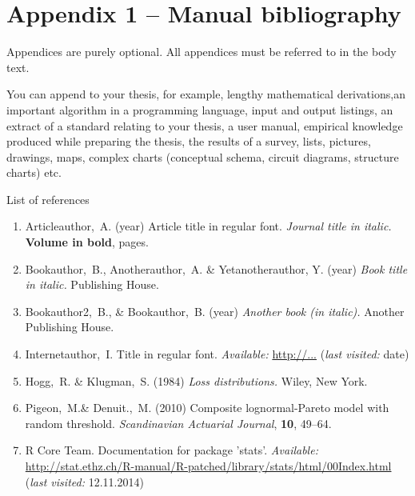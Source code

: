 \section*{Appendix 1 -- Manual bibliography}

Appendices are purely optional. All appendices must be referred to in the body text.

You can append to your thesis, for example, lengthy mathematical derivations,an important algorithm in a programming language, input and output listings, an extract of a standard relating to your thesis, a user manual, empirical knowledge produced while preparing the thesis, the results of a survey, lists, pictures, drawings, maps, complex charts (conceptual schema, circuit diagrams, structure charts) etc.

List of references

\begin{enumerate}
\item Articleauthor,~A. (year) Article title in regular font. \textit{Journal title in italic.} {\bf Volume in bold}, pages.
\item Bookauthor,~B., Anotherauthor,~A. \& Yetanotherauthor, Y. (year) \textit{Book title in italic.} Publishing House.
\item Bookauthor2,~B., \& Bookauthor,~B. (year) \textit{Another book (in italic).} Another Publishing House.
\item Internetauthor,~I. Title in regular font. \textit{Available:} \url{http://...} (\textit{last visited:} date)
\item Hogg,~R. \& Klugman,~S. (1984) \textit{Loss distributions.} Wiley, New York.
\item Pigeon,~M.\& Denuit.,~M. (2010) Composite lognormal-Pareto model with random threshold. \textit{Scandinavian Actuarial Journal}, \textbf{10}, 49--64.
\item R Core Team. Documentation for package 'stats'. \textit{Available:} \url{http://stat.ethz.ch/R-manual/R-patched/library/stats/html/00Index.html} (\textit{last visited:} 12.11.2014)

\end{enumerate}
